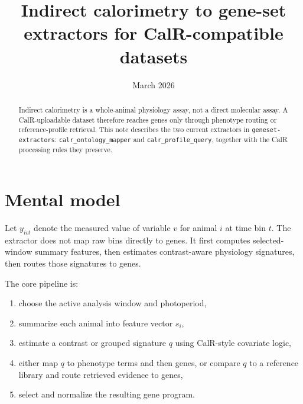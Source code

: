 \documentclass[11pt]{article}
\title{Indirect calorimetry to gene-set extractors for CalR-compatible datasets}
\author{}
\date{March 2026}
\begin{document}
\maketitle

\begin{abstract}
Indirect calorimetry is a whole-animal physiology assay, not a direct molecular assay. A CalR-uploadable dataset therefore reaches genes only through phenotype routing or reference-profile retrieval. This note describes the two current extractors in \texttt{geneset-extractors}: \texttt{calr\_ontology\_mapper} and \texttt{calr\_profile\_query}, together with the CalR processing rules they preserve.
\end{abstract}

\section{Mental model}
Let $y_{ivt}$ denote the measured value of variable $v$ for animal $i$ at time bin $t$. The extractor does not map raw bins directly to genes. It first computes selected-window summary features, then estimates contrast-aware physiology signatures, then routes those signatures to genes.

The core pipeline is:
\begin{enumerate}[leftmargin=2em]
\item choose the active analysis window and photoperiod,
\item summarize each animal into feature vector $s_i$,
\item estimate a contrast or grouped signature $q$ using CalR-style covariate logic,
\item either map $q$ to phenotype terms and then genes, or compare $q$ to a reference library and route retrieved evidence to genes,
\item select and normalize the resulting gene program.
\end{enumerate}
\end{document}

